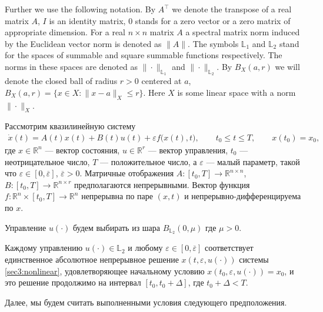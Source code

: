 \documentclass[../main.tex]{subfiles}
\begin{document}
Further we use the following notation. By $A^{\top}$ we denote the transpose of a real matrix $A$, $I$ is an identity matrix, $0$ stands for a zero vector or a zero matrix of appropriate dimension. 
For a real $n \times n$ matrix $A$ a spectral matrix norm induced by the Euclidean vector norm is denoted as $\|A\|$.
The symbols $\mathbb{L}_1$ and $\mathbb{L}_2$ stand for the spaces of summable and square summable functions respectively. The norms in these spaces are denoted as $\|\cdot\|_{\mathbb{L}_1}$ and $\|\cdot\|_{\mathbb{L}_2}$. By $B_X(a,r)$ we will denote the closed ball of radius $r>0$ centered at $a$, $B_X(a, r) = \{x\in X: \|x-a\|_X \leqslant r \}$. Here $X$ is some linear space with a norm $\|\cdot\|_X$.


Рассмотрим квазилинейную систему
\begin{gather}\label{sec3:nonlinear}
	\dot{x}(t) = A(t)x(t)+B(t)u(t)+\varepsilon f\big(x(t),t\big), \qquad t_0 \leqslant t \leqslant T, \qquad x(t_0) = x_0,
\end{gather}
где $ x \in \mathbb{R}^n $ --- вектор состояния, $ u \in \mathbb{R}^r $ --- вектор управления, $t_0$ --- неотрицательное число, $T$ --- положительное число, а $\varepsilon$ --- малый параметр, такой что $\varepsilon \in [0,\overline{\varepsilon}]$, $ \overline{\varepsilon} > 0$. Матричные отображения  $A:[t_0,T] \to \mathbb{R}^{n\times n} $, $B: [t_0,T] \to \mathbb{R}^{n\times r} $ предполагаются непрерывными. 
Вектор функция $f: \mathbb{R}^n \times [t_0,T] \to \mathbb{R}^n$ непрерывна по паре $(x,t)$ и непрерывно-дифференцируема по  $x$.

Управление $ u(\cdot) $ будем выбирать из шара $ B_{\mathbb{L}_2}(0,\mu) $ где $ \mu > 0$.

Каждому управлению $u(\cdot) \in \mathbb{L}_2$ и любому $\varepsilon \in [0,\overline{\varepsilon}]$ соответствует единственное абсолютное непрерывное решение $ x(t,\varepsilon, u(\cdot)) $ системы \eqref{sec3:nonlinear}, удовлетворяющее начальному условию $ x(t_0,\varepsilon, u(\cdot)) = x_0$, и это решение продолжимо на интервал $[t_0, t_0 + \Delta]$, где $t_0 + \Delta < T$. 

Далее, мы будем считать выполненными условия следующего предположения.
\end{document}
